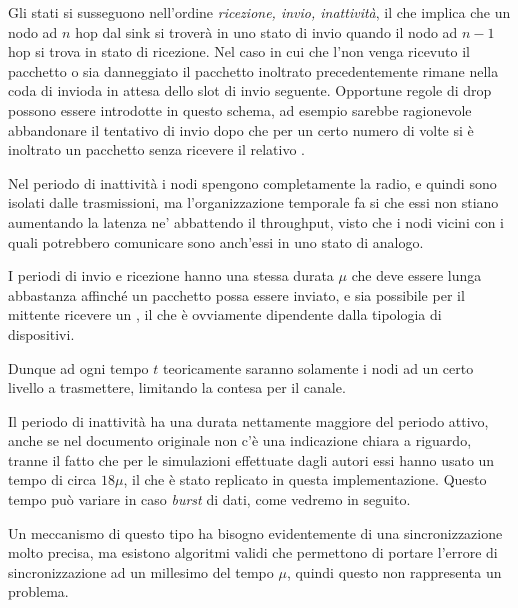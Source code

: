 \documentclass[twoside,11pt,a4paper,italian,openany]{book}
\begin{document}
Gli stati si susseguono nell'ordine \emph{ricezione, invio, inattività}, il che implica
che un nodo ad $n$ hop dal sink si troverà in uno stato di invio quando il nodo ad $n-1$ 
hop si trova in stato di ricezione. 
Nel caso in cui che l'\ack  non venga ricevuto il pacchetto o sia danneggiato il pacchetto 
inoltrato precedentemente rimane nella coda di invioda in attesa dello slot di invio seguente. 
Opportune regole di drop possono essere introdotte in questo schema, ad esempio sarebbe 
ragionevole abbandonare il tentativo di invio dopo che per un certo numero di volte si è 
inoltrato un pacchetto senza ricevere il relativo \ack. 
 
Nel periodo di inattività i nodi spengono completamente la radio, e quindi sono isolati dalle 
trasmissioni, ma l'organizzazione temporale fa si che essi non stiano aumentando la latenza ne' 
abbattendo il throughput, visto che i nodi vicini con i quali potrebbero comunicare sono 
anch'essi in uno stato di analogo. 

I periodi di invio e ricezione hanno una stessa durata $\mu$ che deve essere lunga abbastanza 
affinché un pacchetto possa essere inviato, e  sia possibile per il mittente ricevere un  
 \ack, il che è ovviamente dipendente dalla tipologia di dispositivi. 
 
Dunque ad ogni tempo $t$ teoricamente saranno solamente i nodi ad un certo livello a 
trasmettere, limitando la contesa per il canale. 

Il periodo di inattività ha una durata nettamente maggiore del periodo attivo, anche se nel 
documento originale non c'è una indicazione chiara a riguardo, tranne il fatto che per le 
simulazioni effettuate dagli autori essi hanno usato un tempo di circa $18\mu$, il che è stato replicato in questa implementazione. 
Questo tempo può variare in caso \emph{burst} di dati, come vedremo in seguito.

Un meccanismo di questo tipo ha bisogno evidentemente di una sincronizzazione molto precisa, ma 
esistono algoritmi validi\cite{sync} che permettono di portare l'errore di sincronizzazione 
ad un millesimo del tempo $\mu$, quindi questo non rappresenta un problema. 
\end{document}
